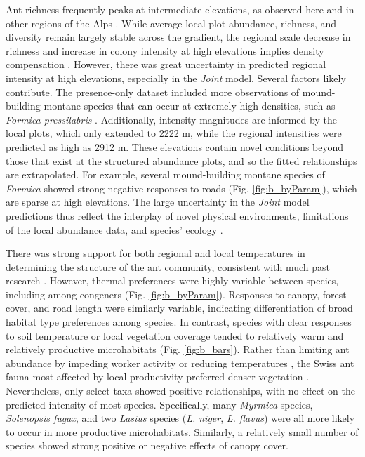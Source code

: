 \documentclass[preprint,final,times,12pt,3p]{elsarticle}
\begin{document}
Ant richness frequently peaks at intermediate elevations, as observed here and in other regions of the Alps \citep{Hellrigl2003,Glaser2006,SzewczykMcCain2016}. While average local plot abundance, richness, and diversity remain largely stable across the gradient, the regional scale decrease in richness and increase in colony intensity at high elevations implies density compensation \citep{LongColw2011}. However, there was great uncertainty in predicted regional intensity at high elevations, especially in the \emph{Joint} model. Several factors likely contribute. The presence-only dataset included more observations of mound-building montane species that can occur at extremely high densities, such as \emph{Formica pressilabris} \citep{Seifert2018}. Additionally, intensity magnitudes are informed by the local plots, which only extended to 2222 m, while the regional intensities were predicted as high as 2912 m. These elevations contain novel conditions beyond those that exist at the structured abundance plots, and so the fitted relationships are extrapolated. For example, several mound-building montane species of \emph{Formica} showed strong negative responses to roads (Fig. \ref{fig:b_byParam}), which are sparse at high elevations. The large uncertainty in the \emph{Joint} model predictions thus reflect the interplay of novel physical environments, limitations of the local abundance data, and species' ecology \citep{Harris2018,Guillera-Arroita2019}. 

There was strong support for both regional and local temperatures in determining the structure of the ant community, consistent with much past research \citep{SandersEtAl2007,Penick2017,Bishop2016,SzewczykMcCain2016,Szewczyk2018}. However, thermal preferences were highly variable between species, including among congeners (Fig. \ref{fig:b_byParam}). Responses to canopy, forest cover, and road length were similarly variable, indicating differentiation of broad habitat type preferences among species. In contrast, species with clear responses to soil temperature or local vegetation coverage tended to relatively warm and relatively productive microhabitats (Fig. \ref{fig:b_bars}). Rather than limiting ant abundance by impeding worker activity or reducing temperatures \citep{LassauHochuli2004,Queiroz2016}, the Swiss ant fauna most affected by local productivity preferred denser vegetation \citep{Andersen1986,Kaspari2000}. Nevertheless, only select taxa showed positive relationships, with no effect on the predicted intensity of most species. Specifically, many \emph{Myrmica} species, \emph{Solenopsis fugax}, and two \emph{Lasius} species (\emph{L. niger}, \emph{L. flavus}) were all more likely to occur in more productive microhabitats. Similarly, a relatively small number of species showed strong positive or negative effects of canopy cover. 
\end{document}
